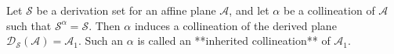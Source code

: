 Let $\mathcal{S}$ be a derivation set for an affine plane $\mathcal{A}$, and let $\alpha$ be a collineation of $\mathcal{A}$ such that $\mathcal{S}^{\alpha} = \mathcal{S}$. Then $\alpha$ induces a collineation of the derived plane $\mathcal{D}_{\mathcal{S}}(\mathcal{A}) = \mathcal{A}_1$. Such an $\alpha$ is called an **inherited collineation** of $\mathcal{A}_1$.
